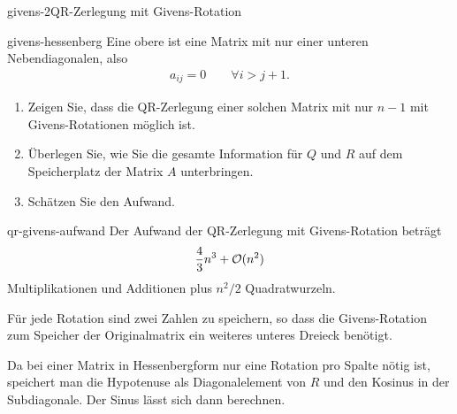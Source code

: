 \begin{Algorithmus*}{givens-2}{QR-Zerlegung mit Givens-Rotation}
  
\end{Algorithmus*}

\begin{Aufgabe}{givens-hessenberg}
  Eine obere  ist eine Matrix mit nur einer
  unteren Nebendiagonalen, also
  \begin{gather}
    a_{ij} = 0\qquad \forall i>j+1.
  \end{gather}
  \begin{enumerate}
  \item Zeigen Sie, dass die QR-Zerlegung einer solchen Matrix mit nur
    $n-1$ mit Givens-Rotationen möglich ist.
  \item Überlegen Sie, wie Sie die gesamte Information für $Q$ und $R$
    auf dem Speicherplatz der Matrix $A$ unterbringen.
  \item Schätzen Sie den Aufwand.
  \end{enumerate}
\end{Aufgabe}

\begin{Lemma}{qr-givens-aufwand}
  Der Aufwand der QR-Zerlegung mit Givens-Rotation beträgt
  \begin{gather}
    \frac43 n^3 + \mathcal O(n^2)
  \end{gather}
  Multiplikationen und Additionen plus $n^2/2$ Quadratwurzeln.

  Für jede Rotation sind zwei Zahlen zu speichern, so dass die
  Givens-Rotation zum Speicher der Originalmatrix ein weiteres unteres
  Dreieck benötigt.

  Da bei einer Matrix in Hessenbergform nur eine Rotation pro Spalte
  nötig ist, speichert man die Hypotenuse als Diagonalelement von $R$
  und den Kosinus in der Subdiagonale. Der Sinus lässt sich dann
  berechnen.
\end{Lemma}



